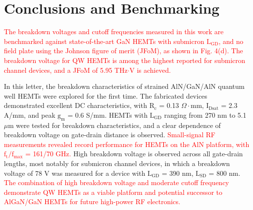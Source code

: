 \documentclass[journal]{IEEEtran}
\begin{document}
\section{Conclusions and Benchmarking}
\textcolor{red}{The breakdown voltages and cutoff frequencies measured in this work are benchmarked against state-of-the-art GaN HEMTs with submicron $\mathrm{L_{GD}}$, and no field plate \cite{Shinohara2010,Shinohara2011,Shinohara2011a,Tang2015,Chung2010,Hemts2006,Saunier2012,Snider2012,Guo2013,Lee2013,Dasgupta2009,Nidhi2012,Denninghoff2012,Denninghoff2012a,Denninghoff2013,Romanczyk2018,Shinohara2012,Yue2013} using the Johnson figure of merit (JFoM), as shown in Fig. 4(d). The breakdown voltage for QW HEMTs is among the highest reported for submicron channel devices, and a JFoM of 5.95 THz$\cdot$V is achieved.}

In this letter, the breakdown characteristics of strained AlN/GaN/AlN quantum well HEMTs were explored for the first time. The fabricated devices demonstrated excellent DC characteristics, with $\mathrm{R_c}$ = 0.13 $\Omega\cdot$mm, $\mathrm{I_{Dsat}}$ = 2.3 A/mm, and peak $\mathrm{g_m}$ = 0.6 S/mm. HEMTs with $\mathrm{L_{GD}}$ ranging from 270 nm to 5.1 $\mu$m were tested for breakdown characteristics, and a clear dependence of breakdown voltage on gate-drain distance is observed. \textcolor{red}{Small-signal RF measurements revealed record performance for HEMTs on the AlN platform, with $\mathrm{f_t/f_{max}}$ = 161/70 GHz.} High breakdown voltage is observed across all gate-drain lengths, most notably for submicron channel devices, in which a breakdown voltage of 78 V was measured for a device with $\mathrm{L_{GD}}$ = 390 nm, $\mathrm{L_{SD}}$ = 800 nm. \textcolor{red}{The combination of high breakdown voltage and moderate cutoff frequency demonstrate QW HEMTs as a viable platform and potential successor to AlGaN/GaN HEMTs for future high-power RF electronics.}

\vfill

{\color{white}
\pagebreak
}


%


\end{document}

